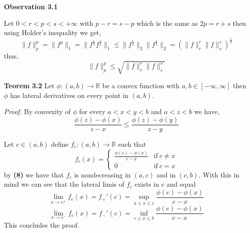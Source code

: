 \documentclass{article}
\begin{document}
\bigbreak

\begin{observation}\textbf{Observation 3.1}

Let $0 < r < p < s < +\infty$ with $p-r=s-p$ which is the same as $2p=r+s$ then using Holder's inequality we get,  
\[
    \|f\|_p^p = \|f^p\|_1 = \|f^{\frac{r}{2}}f^{\frac{s}{2}}\|_1 \le \|f^{\frac{r}{2}}\|_2 \|f^{\frac{s}{2}}\|_2 = \left( \|f\|_r^r \|f\|_s^s   \right)^{\frac{1}{2}}    
\]
thus,
\[
    \|f\|_p^p \le \sqrt{\|f\|_r^r \|f\|_s^s  }   
\]
\end{observation}

\begin{theorem}\textbf{Teorem 3.2}
    Let $\phi : \left( a,b \right) \rightarrow \mathbb{R}$ be a convex function with $a,b \in [-\infty,\infty]$ then $\phi$ has lateral derivatives on every point in $ \left( a,b \right) $.

    \textit{Proof.} By convexity of $\phi$ for every $a < x < y < b$ and $a< z <b$  we have,
    \begin{equation}
        \frac{\phi \left( z \right) - \phi \left( x \right) }{z - x} \le \frac{\phi \left( z \right) - \phi \left( y \right) }{z - y}
    \end{equation}

    Let $c \in \left( a,b \right) $ define $f_c: \left( a,b \right) \rightarrow \mathbb{R}$ such that
    \[
    f_c \left( x \right) = 
       \begin{cases}
           \frac{\phi(c)-\phi(x)}{c-x} & \text{if}\  c \neq x \\
           0 & \text{if}\ c = x
       \end{cases}
    \]
    by \textbf{(8)} we have that $f_c$ is nondecreasing in $ \left( a,c \right) $ and in $ \left( c,b \right) $. With this in mind we can see that the lateral limis of $f_c$ exists in c and equal
    \[
        \lim_{x \to c^+}f_c \left( x \right) = f_{+}' \left( c \right) = \sup_{a \le x \le c}\frac{\phi(c)-\phi(x)}{c-x} 
    \]
    \[
        \lim_{x \to c^-}f_c \left( x \right) = f_{-}' \left( c \right)  = \inf_{c \le x \le b}\frac{\phi(c)-\phi(x)}{c-x}
    \]
    This concludes the proof.
\end{theorem}
\end{document}
